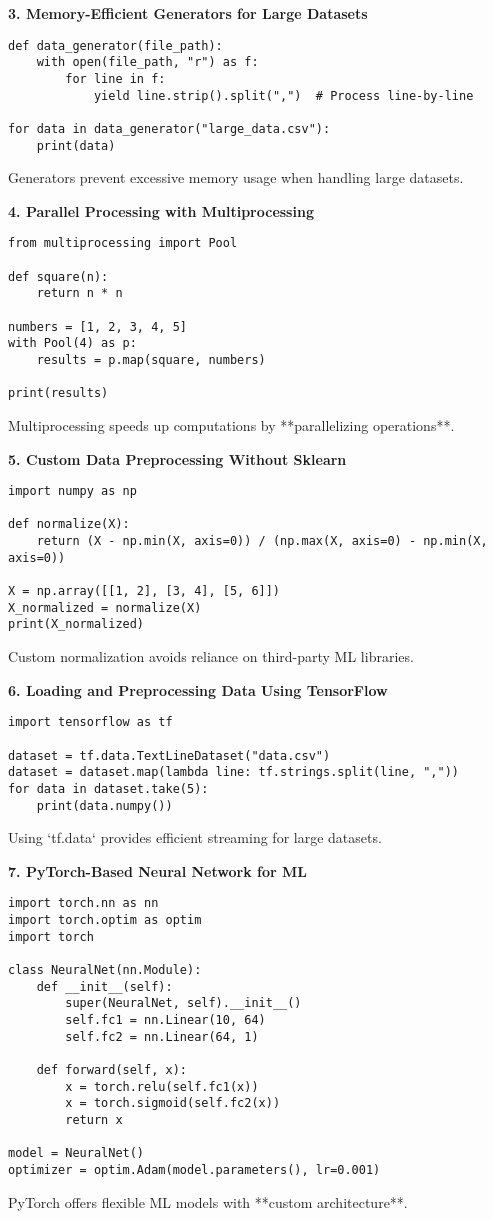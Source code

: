 \textbf{3. Memory-Efficient Generators for Large Datasets}
\begin{verbatim}
def data_generator(file_path):
    with open(file_path, "r") as f:
        for line in f:
            yield line.strip().split(",")  # Process line-by-line

for data in data_generator("large_data.csv"):
    print(data)
\end{verbatim}
Generators prevent excessive memory usage when handling large datasets.

\textbf{4. Parallel Processing with Multiprocessing}
\begin{verbatim}
from multiprocessing import Pool

def square(n):
    return n * n

numbers = [1, 2, 3, 4, 5]
with Pool(4) as p:
    results = p.map(square, numbers)

print(results)
\end{verbatim}
Multiprocessing speeds up computations by **parallelizing operations**.

\textbf{5. Custom Data Preprocessing Without Sklearn}
\begin{verbatim}
import numpy as np

def normalize(X):
    return (X - np.min(X, axis=0)) / (np.max(X, axis=0) - np.min(X, axis=0))

X = np.array([[1, 2], [3, 4], [5, 6]])
X_normalized = normalize(X)
print(X_normalized)
\end{verbatim}
Custom normalization avoids reliance on third-party ML libraries.

\textbf{6. Loading and Preprocessing Data Using TensorFlow}
\begin{verbatim}
import tensorflow as tf

dataset = tf.data.TextLineDataset("data.csv")
dataset = dataset.map(lambda line: tf.strings.split(line, ","))
for data in dataset.take(5):
    print(data.numpy())
\end{verbatim}
Using `tf.data` provides efficient streaming for large datasets.

\textbf{7. PyTorch-Based Neural Network for ML}
\begin{verbatim}
import torch.nn as nn
import torch.optim as optim
import torch

class NeuralNet(nn.Module):
    def __init__(self):
        super(NeuralNet, self).__init__()
        self.fc1 = nn.Linear(10, 64)
        self.fc2 = nn.Linear(64, 1)

    def forward(self, x):
        x = torch.relu(self.fc1(x))
        x = torch.sigmoid(self.fc2(x))
        return x

model = NeuralNet()
optimizer = optim.Adam(model.parameters(), lr=0.001)
\end{verbatim}
PyTorch offers flexible ML models with **custom architecture**.

